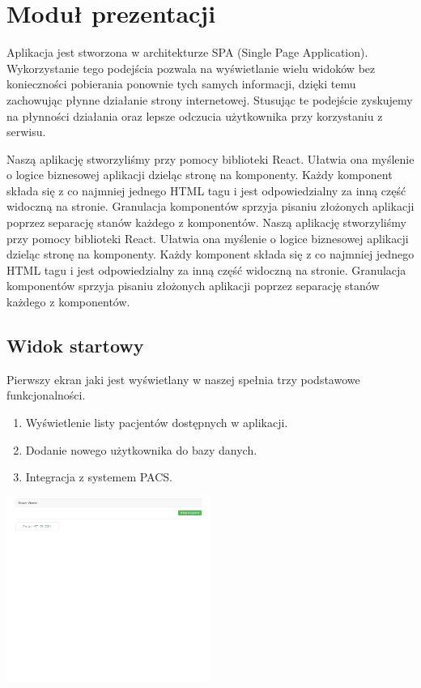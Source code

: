 \documentclass[a4paper,11pt,twoside]{report}
\theoremstyle{definition}
\begin{document}
\section{Moduł prezentacji}
Aplikacja jest stworzona w architekturze SPA (Single Page Application). Wykorzystanie tego podejścia pozwala na wyświetlanie wielu widoków bez konieczności pobierania ponownie tych samych informacji, dzięki temu zachowując płynne działanie strony internetowej. Stusując te podejście zyskujemy na płynności działania oraz lepsze odczucia użytkownika przy korzystaniu z serwisu.

Naszą aplikację stworzyliśmy przy pomocy biblioteki React. Ułatwia ona myślenie o logice biznesowej aplikacji dzieląc stronę na komponenty. Każdy komponent składa się z co najmniej jednego HTML tagu i jest odpowiedzialny za inną część widoczną na stronie. Granulacja komponentów sprzyja pisaniu złożonych aplikacji poprzez separację stanów każdego z komponentów.
Naszą aplikację stworzyliśmy przy pomocy biblioteki React. Ułatwia ona myślenie o logice biznesowej aplikacji dzieląc stronę na komponenty. Każdy komponent składa się z co najmniej jednego HTML tagu i jest odpowiedzialny za inną część widoczną na stronie. Granulacja komponentów sprzyja pisaniu złożonych aplikacji poprzez separację stanów każdego z komponentów.

\subsection{Widok startowy}
Pierwszy ekran jaki jest wyświetlany w naszej spełnia trzy podstawowe funkcjonalności.
\begin{enumerate}
\item Wyświetlenie listy pacjentów dostępnych w aplikacji.
\item Dodanie nowego użytkownika do bazy danych.
\item Integracja z systemem PACS.
\end{enumerate}

\begin{minipage}{\linewidth}
	\centering
	\includegraphics[width=0.5\textwidth]{FrontScreen/Main/0.png}
\end{minipage}
\end{document}

